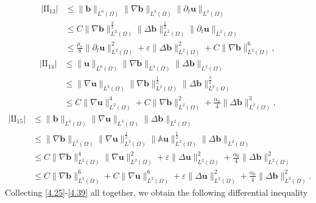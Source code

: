 \documentclass[11pt]{article}
\numberwithin{equation}{section}
\begin{document}
\begin{equation}\label{4.37}
\begin{split}
|\text{II}_{13}|&\leq \|\mathbf{b}\|_{L^6(\Omega)}\|\nabla\mathbf{b}\|_{L^3(\Omega)}
\|\partial_t\mathbf{u}\|_{L^2(\Omega)} \\
&\leq C\|\nabla\mathbf{b}\|_{L^2(\Omega)}^{\frac{3}{2}}
\|\Delta\mathbf{b}\|_{L^2(\Omega)}^{\frac{1}{2}}
\|\partial_t\mathbf{u}\|_{L^2(\Omega)}\\
&\leq \frac{\rho_*}{8}\|\partial_t\mathbf{u}\|_{L^2(\Omega)}^2
+\varepsilon\|\Delta\mathbf{b}\|_{L^2(\Omega)}^2 + C\|\nabla\mathbf{b}\|_{L^2(\Omega)}^6,
\end{split}
\end{equation}
\begin{equation}\label{4.38}
\begin{split}
|\text{II}_{14}|&\leq \|\mathbf{u}\|_{L^6(\Omega)}\|\nabla\mathbf{b}\|_{L^3(\Omega)}
\|\Delta\mathbf{b}\|_{L^2(\Omega)} \\
&\leq
\|\nabla\mathbf{u}\|_{L^2(\Omega)}\|\nabla\mathbf{b}\|_{L^2(\Omega)}^{\frac{1}{2}}
\|\Delta\mathbf{b}\|_{L^2(\Omega)}^{\frac{3}{2}} \\
&\leq
C\|\nabla\mathbf{u}\|_{L^2(\Omega)}^4+C\|\nabla\mathbf{b}\|_{L^2(\Omega)}^2
+\frac{\alpha_0}{4}\|\Delta\mathbf{b}\|_{L^2(\Omega)}^3,
\end{split}
\end{equation}
\begin{equation}\label{4.39}
\begin{split}
|\text{II}_{15}|&\leq \|\mathbf{b}\|_{L^6(\Omega)}\|\nabla\mathbf{u}\|_{L^3(\Omega)}
\|\Delta\mathbf{b}\|_{L^2(\Omega)} \\
&\leq
\|\nabla\mathbf{b}\|_{L^2(\Omega)}\|\nabla\mathbf{u}\|_{L^2(\Omega)}^{\frac{1}{2}}
\|\mathbb{A}\mathbf{u}\|_{L^2(\Omega)}^{\frac{1}{2}}
\|\Delta\mathbf{b}\|_{L^2(\Omega)} \\
&\leq
C\|\nabla\mathbf{b}\|_{L^2(\Omega)}^4\|\nabla\mathbf{u}\|_{L^2(\Omega)}^2
+\varepsilon\|\Delta\mathbf{u}\|_{L^2(\Omega)}^2
+\frac{\alpha_0}{4}\|\Delta\mathbf{b}\|_{L^2(\Omega)} ^{2} \\
&\leq C\|\nabla\mathbf{b}\|_{L^2(\Omega)}^6+C\|\nabla\mathbf{u}\|_{L^2(\Omega)}^6
+\varepsilon\|\Delta\mathbf{u}\|_{L^2(\Omega)}^2
+\frac{\alpha_0}{4}\|\Delta\mathbf{b}\|_{L^2(\Omega)} ^{2}.
\end{split}
\end{equation}
 Collecting \eqref{4.25}-\eqref{4.39} all together, we obtain  the following differential inequality
\end{document}
